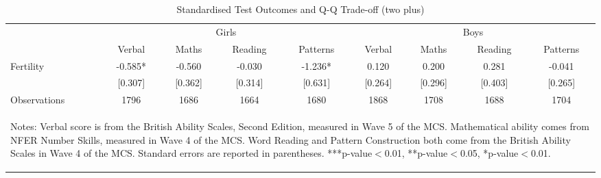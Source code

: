 \begin{table}[htbp]\centering
\def\sym#1{\ifmmode^{#1}\else\(^{#1}\)\fi}
\caption{Standardised Test Outcomes and Q-Q Trade-off (two plus)}
\begin{tabular}{l*{8}{c}}
\toprule
                    &\multicolumn{4}{c}{Girls}                                      &\multicolumn{4}{c}{Boys}                                       \\\cmidrule(lr){2-5}\cmidrule(lr){6-9}
                    &      Verbal   &       Maths   &     Reading   &    Patterns   &      Verbal   &       Maths   &     Reading   &    Patterns   \\
\midrule
Fertility           &      -0.585*  &      -0.560   &      -0.030   &      -1.236*  &       0.120   &       0.200   &       0.281   &      -0.041   \\
                    &     [0.307]   &     [0.362]   &     [0.314]   &     [0.631]   &     [0.264]   &     [0.296]   &     [0.403]   &     [0.265]   \\
\midrule
Observations        &        1796   &        1686   &        1664   &        1680   &        1868   &        1708   &        1688   &        1704   \\
\bottomrule\multicolumn{9}{p{15.8cm}}{\begin{footnotesize}
Notes: Verbal score is from the British Ability Scales,   
Second Edition, measured in Wave 5 of the MCS.            
Mathematical ability comes from NFER Number Skills,       
measured in Wave 4 of the MCS. Word Reading and Pattern   
Construction both come from the British Ability Scales in 
Wave 4 of the MCS. Standard errors are reported in parentheses. ***p-value$<$0.01, **p-value$<$0.05, *p-value$<$0.01.                                
\end{footnotesize}}\end{tabular}\end{table}